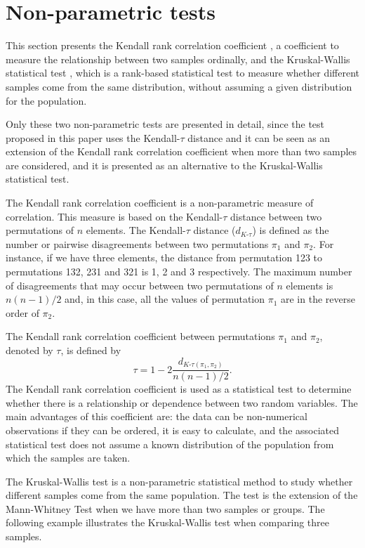 \section{Non-parametric tests} \label{sec:nonparametric}

This section presents the Kendall rank correlation coefficient \citep{Kendall1938}, a coefficient to measure the relationship between two samples ordinally, and the Kruskal-Wallis statistical test \citep{Kruskal1952}, which is a rank-based statistical test to measure whether different samples come from the same distribution, without assuming a given distribution for the population.

Only these two non-parametric tests are presented in detail, since the test proposed in this paper uses the Kendall-$\tau$ distance and it can be seen as an extension of the Kendall rank correlation coefficient when more than two samples are considered, and it is presented as an alternative to the Kruskal-Wallis statistical test.

The Kendall rank correlation coefficient is a non-parametric measure of correlation. This measure is based on the Kendall-$\tau$ distance between two permutations of $n$ elements. The Kendall-$\tau$ distance ($d_{K\text{-}\tau}$) is defined as the number or pairwise disagreements between two permutations $\pi_1$ and $\pi_2$. For instance, if we have three elements, the distance from permutation 123 to permutations 132, 231 and 321 is 1, 2 and 3 respectively. The maximum number of disagreements that may occur between two permutations of $n$ elements is $n(n-1)/2$ and, in this case, all the values of permutation $\pi_1$  are in the reverse order of $\pi_2$. 

The Kendall rank correlation coefficient between permutations $\pi_1$ and $\pi_2$, denoted by $\tau$, is defined by 
$$ \tau = 1 -  2 \frac{d_{K\text{-}\tau(\pi_1,\pi_2)}}{n(n-1)/2}.$$
The Kendall rank correlation  coefficient is used as a statistical test to determine whether there is a relationship or dependence between two random variables. The main advantages of this coefficient are: the data can be non-numerical observations if they can be ordered, it is easy to calculate, and the associated statistical test does not assume a known distribution of the population from which the samples are taken. 

The Kruskal-Wallis test is a non-parametric statistical method to study whether different samples come from the same population. The test is the extension of the Mann-Whitney Test \citep{Wilcoxon1947} when we have more than two samples or groups. 
The following example illustrates the Kruskal-Wallis test when comparing three samples.

